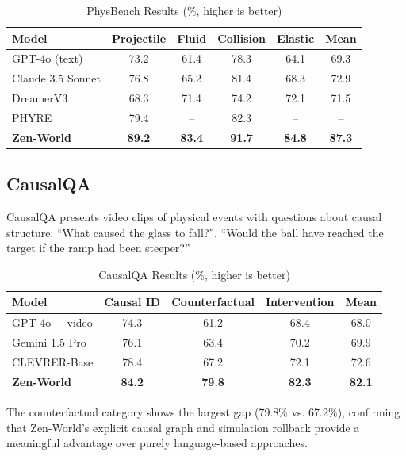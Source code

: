 \documentclass[11pt,a4paper]{article}
\begin{document}
\begin{table}[H]
\centering
\begin{tabular}{lccccc}
\toprule
\textbf{Model} & \textbf{Projectile} & \textbf{Fluid} & \textbf{Collision} & \textbf{Elastic} & \textbf{Mean} \\
\midrule
GPT-4o (text) & 73.2 & 61.4 & 78.3 & 64.1 & 69.3 \\
Claude 3.5 Sonnet & 76.8 & 65.2 & 81.4 & 68.3 & 72.9 \\
DreamerV3 & 68.3 & 71.4 & 74.2 & 72.1 & 71.5 \\
PHYRE & 79.4 & -- & 82.3 & -- & -- \\
\textbf{Zen-World} & \textbf{89.2} & \textbf{83.4} & \textbf{91.7} & \textbf{84.8} & \textbf{87.3} \\
\bottomrule
\end{tabular}
\caption{PhysBench Results (\%, higher is better)}
\end{table}

\subsection{CausalQA}

CausalQA presents video clips of physical events with questions about causal structure:
``What caused the glass to fall?'', ``Would the ball have reached the target if the ramp
had been steeper?''

\begin{table}[H]
\centering
\begin{tabular}{lcccc}
\toprule
\textbf{Model} & \textbf{Causal ID} & \textbf{Counterfactual} & \textbf{Intervention} & \textbf{Mean} \\
\midrule
GPT-4o + video & 74.3 & 61.2 & 68.4 & 68.0 \\
Gemini 1.5 Pro & 76.1 & 63.4 & 70.2 & 69.9 \\
CLEVRER-Base & 78.4 & 67.2 & 72.1 & 72.6 \\
\textbf{Zen-World} & \textbf{84.2} & \textbf{79.8} & \textbf{82.3} & \textbf{82.1} \\
\bottomrule
\end{tabular}
\caption{CausalQA Results (\%, higher is better)}
\end{table}

The counterfactual category shows the largest gap (79.8\% vs. 67.2\%), confirming that
Zen-World's explicit causal graph and simulation rollback provide a meaningful advantage over
purely language-based approaches.
\end{document}
